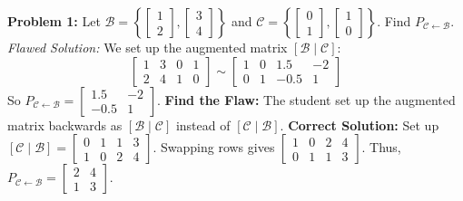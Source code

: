 \documentclass[11pt]{article}
\begin{document}
\textbf{Problem 1:} Let $\mathcal{B} = \left\{ \begin{bmatrix} 1 \\ 2 \end{bmatrix}, \begin{bmatrix} 3 \\ 4 \end{bmatrix} \right\}$ and $\mathcal{C} = \left\{ \begin{bmatrix} 0 \\ 1 \end{bmatrix}, \begin{bmatrix} 1 \\ 0 \end{bmatrix} \right\}$. Find $P_{\mathcal{C} \leftarrow \mathcal{B}}$.
\textit{Flawed Solution:} We set up the augmented matrix $[ \mathcal{B} \mid \mathcal{C} ]$:
\[ \begin{bmatrix} 1 & 3 & 0 & 1 \\ 2 & 4 & 1 & 0 \end{bmatrix} \sim \begin{bmatrix} 1 & 0 & 1.5 & -2 \\ 0 & 1 & -0.5 & 1 \end{bmatrix} \]
So $P_{\mathcal{C} \leftarrow \mathcal{B}} = \begin{bmatrix} 1.5 & -2 \\ -0.5 & 1 \end{bmatrix}$.
\textbf{Find the Flaw:} The student set up the augmented matrix backwards as $[ \mathcal{B} \mid \mathcal{C} ]$ instead of $[ \mathcal{C} \mid \mathcal{B} ]$.
\textbf{Correct Solution:} Set up $[ \mathcal{C} \mid \mathcal{B} ] = \begin{bmatrix} 0 & 1 & 1 & 3 \\ 1 & 0 & 2 & 4 \end{bmatrix}$. Swapping rows gives $\begin{bmatrix} 1 & 0 & 2 & 4 \\ 0 & 1 & 1 & 3 \end{bmatrix}$. Thus, $P_{\mathcal{C} \leftarrow \mathcal{B}} = \begin{bmatrix} 2 & 4 \\ 1 & 3 \end{bmatrix}$.

\vspace{0.5cm}
\end{document}
